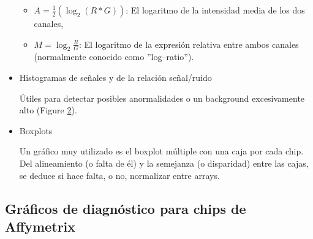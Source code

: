 \begin{itemize}
\begin{itemize}
\item $A=\displaystyle \frac{1}{2}(\log_2 (R*G))$: El logaritmo de la intensidad media de los dos
canales,

\item $M=\log_2 \displaystyle \frac{R}{G}$: El logaritmo de la expresi\'on relativa entre
ambos canales (normalmente conocido como ''log--ratio'').
\end{itemize}


\vspace{-0.5cm}
\begin{figure}[!h]
\label{fig:c05normScatterMA}
\end{figure}

 \item Histogramas de se\~nales y de la relaci\'on se\~nal/ruido

\'Utiles para detectar posibles anormalidades o un background excesivamente alto (Figure \ref{c05signalNoise}).



\vspace{-0.5cm}
\begin{figure}[!h]
\label{c05signalNoise}
\end{figure}

 \item Boxplots

Un gr\'afico muy utilizado es el boxplot m\'ultiple con una caja por cada chip. Del
alineamiento (o falta de \'el) y la semejanza (o disparidad) entre las cajas, se deduce si hace
falta, o no, normalizar entre arrays.

\end{itemize}



\subsection{Gr\'aficos de diagn\'ostico para chips de Affymetrix}

